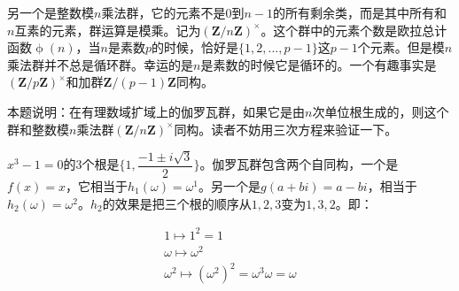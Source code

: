\documentclass[b5paper]{ctexart}
\begin{document}
\begin{Answer}[ref = {ex:automorphism}]
{\begin{mdframed}
\vspace{5mm}

另一个是整数模$n$乘法群，它的元素不是0到$n-1$的所有剩余类，而是其中所有和$n$互素的元素，群运算是模乘。记为$(\pmb{Z}/n\pmb{Z})^{\times}$。这个群中的元素个数是欧拉总计函数$\upphi(n)$，当$n$是素数$p$的时候，恰好是$\{1, 2, ..., p-1\}$这$p-1$个元素。但是模$n$乘法群并不总是循环群。幸运的是$n$是素数的时候它是循环的。一个有趣事实是$(\pmb{Z}/p\pmb{Z})^{\times}$和加群$\pmb{Z}/(p-1)\pmb{Z}$同构。

\vspace{5mm}

本题说明：在有理数域扩域上的伽罗瓦群，如果它是由$n$次单位根生成的，则这个群和整数模$n$乘法群$(\pmb{Z}/n\pmb{Z})^{\times}$同构。读者不妨用三次方程来验证一下。

$x^3 - 1 = 0$的3个根是$\{1, \dfrac{-1 \pm i \sqrt{3}}{2}\}$。伽罗瓦群包含两个自同构，一个是$f(x) = x$，它相当于$h_1(\omega) = \omega^1$。另一个是$g(a + bi) = a - bi$，相当于$h_2(\omega) = \omega^2$。$h_2$的效果是把三个根的顺序从$1, 2, 3$变为$1, 3, 2$。即：

\[
\begin{array}{l}
1 \mapsto 1^2 = 1 \\
\omega \mapsto \omega^2 \\
\omega^2 \mapsto (\omega^2)^2 = \omega^3 \omega = \omega \\
\end{array}
\]

\end{mdframed}
}
\end{Answer}
\end{document}
